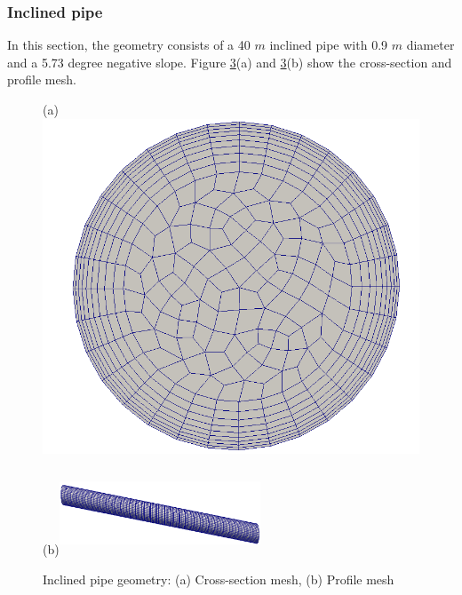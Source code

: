\documentclass[11pt]{report}
\begin{document}
\begin{minipage}[t]{0.35\textwidth}
\begin{minipage}[t]{0.5\textwidth}
 \subsubsection{Inclined pipe}\label{inclined}
 In this section, the geometry consists of a 40 $m$ inclined pipe with 0.9 $m$ diameter and a 5.73 degree negative slope. Figure \ref{incline}(a) and \ref{incline}(b) show the
 cross-section and profile mesh.\\
 \begin{minipage}[t]{0.35\textwidth}
 \begin{figure}[ht!]
 \begin{center}
 (a)\includegraphics[scale =0.09]{figs/section.png}
 \label{fig:gauss}
 \end{center}
 \end{figure}

 \begin{figure}[ht!]
 (b)\includegraphics[width=6cm,height=2.5cm]{figs/IP}
 \label{fig:gauss}
 \end{figure}

 \begin{figure}[ht!]
 \centering
 \caption{Inclined pipe geometry: (a) Cross-section mesh, (b) Profile mesh }
 \label{incline}
 \end{figure}


\end{minipage}
\end{minipage}
\end{minipage}
\end{document}
